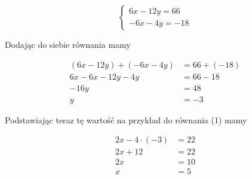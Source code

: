\documentclass[10pt]{article}
\begin{document}
\[
\left\{\begin{array}{c}
6 x-12 y=66 \\
-6 x-4 y=-18
\end{array}\right.
\]

Dodając do siebie równania mamy

\[
\begin{aligned}
(6 x-12 y)+(-6 x-4 y) & =66+(-18) \\
6 x-6 x-12 y-4 y & =66-18 \\
-16 y & =48 \\
y & =-3
\end{aligned}
\]

Podstawiając teraz tę wartość na przykład do równania (1) mamy

\[
\begin{aligned}
2 x-4 \cdot(-3) & =22 \\
2 x+12 & =22 \\
2 x & =10 \\
x & =5
\end{aligned}
\]
\end{document}
